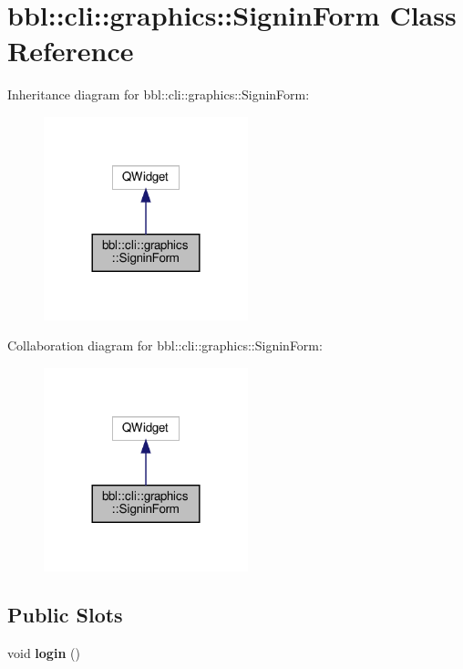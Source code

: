 \hypertarget{classbbl_1_1cli_1_1graphics_1_1_signin_form}{}\section{bbl\+:\+:cli\+:\+:graphics\+:\+:Signin\+Form Class Reference}
\label{classbbl_1_1cli_1_1graphics_1_1_signin_form}


Inheritance diagram for bbl\+:\+:cli\+:\+:graphics\+:\+:Signin\+Form\+:
\nopagebreak
\begin{figure}[H]
\begin{center}
\leavevmode
\includegraphics[width=168pt]{classbbl_1_1cli_1_1graphics_1_1_signin_form__inherit__graph}
\end{center}
\end{figure}


Collaboration diagram for bbl\+:\+:cli\+:\+:graphics\+:\+:Signin\+Form\+:
\nopagebreak
\begin{figure}[H]
\begin{center}
\leavevmode
\includegraphics[width=168pt]{classbbl_1_1cli_1_1graphics_1_1_signin_form__coll__graph}
\end{center}
\end{figure}
\subsection*{Public Slots}
\begin{DoxyCompactItemize}
\item 
\mbox{\label{classbbl_1_1cli_1_1graphics_1_1_signin_form_ac239f8fd91cc0b8f58aba3a377cad960}} 
void {\bfseries login} ()
\end{DoxyCompactItemize}
